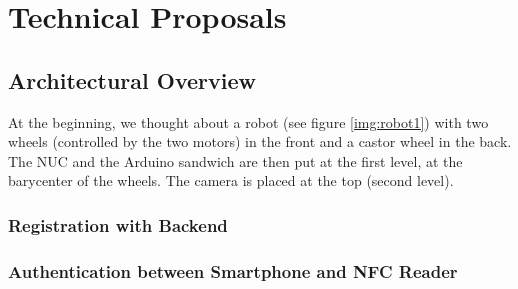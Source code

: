\section{Technical Proposals}

\subsection{Architectural Overview}
At the beginning, we thought about a robot (see figure \ref{img:robot1}) with two wheels (controlled by the two motors) in the front and a castor wheel in the back. The NUC and the Arduino sandwich are then put at the first level, at the barycenter of the wheels. The camera is placed at the top (second level).

\subsubsection{Registration with Backend}

\subsubsection{Authentication between Smartphone and NFC Reader}